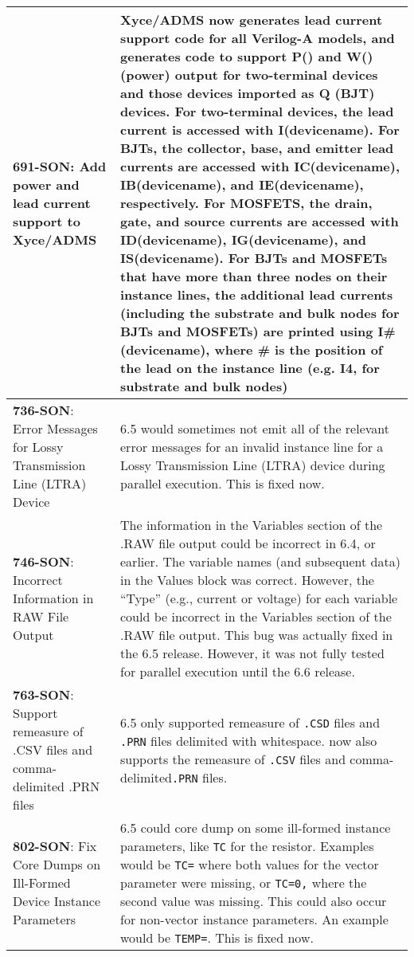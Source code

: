{\begin{longtable}[h] {>{\raggedright\small}m{2in}|>{\raggedright\let\\\tabularnewline\small}m{3.5in}}
     \textbf{691-SON}: Add power and lead current support to Xyce/ADMS & Xyce/ADMS now generates lead current support code for all Verilog-A models, and generates code to support P() and W() (power) output for two-terminal devices and those devices imported as Q (BJT) devices.  For two-terminal devices, the lead current is accessed with I(devicename).  For BJTs, the collector, base, and emitter lead currents are accessed with IC(devicename), IB(devicename), and IE(devicename), respectively.  For MOSFETS, the drain, gate, and source currents are accessed with ID(devicename), IG(devicename), and IS(devicename).  For BJTs and MOSFETs that have more than three nodes on their instance lines, the additional lead currents (including the substrate and bulk nodes for BJTs and MOSFETs) are printed  using I\#(devicename), where \# is the position of the lead on the instance line (e.g. I4, for substrate and bulk nodes) \\ \hline

     \textbf{736-SON}: Error Messages for Lossy Transmission Line (LTRA) Device & \Xyce{} 6.5 would 
     sometimes not emit all of the relevant error messages for an invalid instance line for a
     Lossy Transmission Line (LTRA) device during parallel execution.  This is fixed now. \\ \hline

     \textbf{746-SON}: Incorrect Information in RAW File Output & The information in the
     Variables section of the .RAW file output could be incorrect in \Xyce{} 6.4, or earlier.
     The variable names (and subsequent data) in the Values block was correct.  However,
     the ``Type'' (e.g., current or voltage) for each variable could be incorrect
     in the Variables section of the .RAW file output.  This bug was actually fixed in the
     \Xyce{} 6.5 release.  However, it was not fully tested for parallel execution until the
     \Xyce{} 6.6 release. \\ \hline

     \textbf{763-SON}: Support remeasure of .CSV files and comma-delimited .PRN files & 
     \Xyce{} 6.5 only supported remeasure of \texttt{.CSD} files and \texttt{.PRN} files 
     delimited with whitespace.  \Xyce{} now also supports the remeasure of \texttt{.CSV} 
     files and comma-delimited\texttt{.PRN} files.\\ \hline

     \textbf{802-SON}: Fix Core Dumps on Ill-Formed Device Instance Parameters & \Xyce{} 6.5 
     could core dump on some ill-formed instance parameters, like \texttt{TC} for the 
     resistor. Examples would be \texttt{TC=} where both values for the vector parameter 
     were missing, or \texttt{TC=0,} where the second value was missing.  This could
     also occur for non-vector instance parameters.  An example would be \texttt{TEMP=}.
     This is fixed now.\\ \hline


\end{longtable}}
